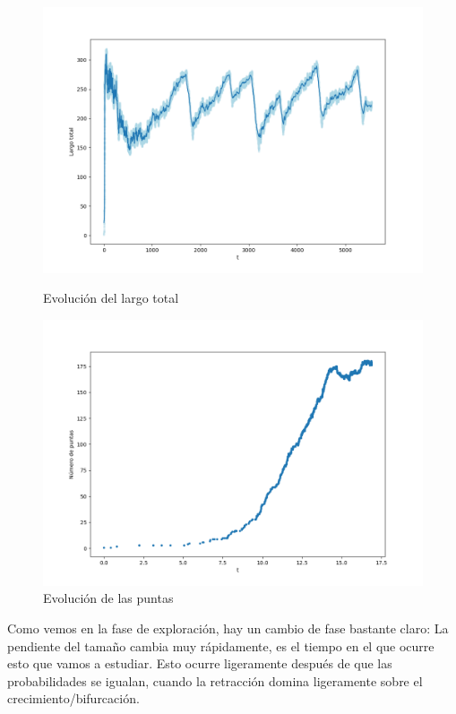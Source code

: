 \documentclass{article}
\begin{document}
\begin{figure}[h!]
\begin{minipage}{0.5\textwidth}
    \centering
    \includegraphics[width=\textwidth]{graficos_inst/largo_vs_tiempo.png}
    \caption[]{Evolución del largo total}
    \label{fig:l_vs_tiempo_princ}
\end{minipage} 
\begin{minipage}{0.5\textwidth}
    \centering
    \includegraphics[width=\textwidth]{graficos_inst/N_vs_tiempo_principio.png}
    \caption[]{Evolución de las puntas}
    \label{fig:N_vs_tiempo_princ}
\end{minipage}   
\end{figure}

Como vemos en la fase de exploración, hay un cambio de fase bastante claro: La pendiente del tamaño cambia muy rápidamente, es el tiempo en el que ocurre esto que vamos a estudiar.
Esto ocurre ligeramente después de que las probabilidades se igualan, cuando la retracción domina ligeramente sobre el crecimiento/bifurcación.
\end{document}

